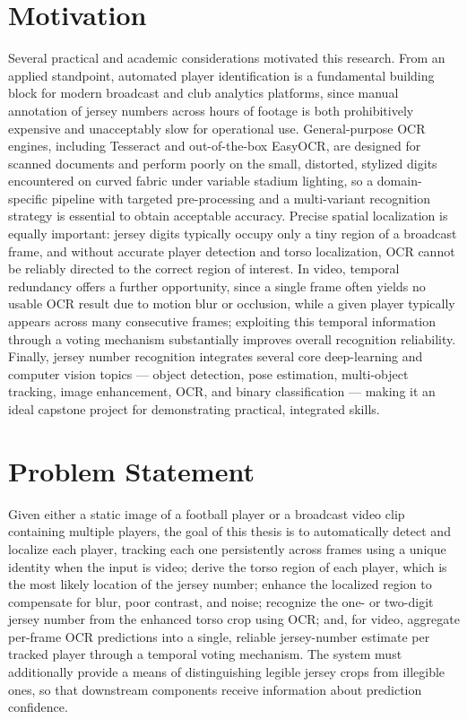 \section{Motivation}
\label{sec:motivation}

Several practical and academic considerations motivated this research.
From an applied standpoint, automated player identification is a
fundamental building block for modern broadcast and club analytics
platforms, since manual annotation of jersey numbers across hours of
footage is both prohibitively expensive and unacceptably slow for
operational use. General-purpose OCR engines, including Tesseract and
out-of-the-box EasyOCR, are designed for scanned documents and perform
poorly on the small, distorted, stylized digits encountered on curved
fabric under variable stadium lighting, so a domain-specific pipeline
with targeted pre-processing and a multi-variant recognition strategy
is essential to obtain acceptable accuracy. Precise spatial
localization is equally important: jersey digits typically occupy only
a tiny region of a broadcast frame, and without accurate player
detection and torso localization, OCR cannot be reliably directed to
the correct region of interest. In video, temporal redundancy offers a
further opportunity, since a single frame often yields no usable OCR
result due to motion blur or occlusion, while a given player typically
appears across many consecutive frames; exploiting this temporal
information through a voting mechanism substantially improves overall
recognition reliability. Finally, jersey number recognition integrates
several core deep-learning and computer vision topics --- object
detection, pose estimation, multi-object tracking, image enhancement,
OCR, and binary classification --- making it an ideal capstone project
for demonstrating practical, integrated skills.

\section{Problem Statement}
\label{sec:problem-statement}

Given either a static image of a football player or a broadcast video
clip containing multiple players, the goal of this thesis is to
automatically detect and localize each player, tracking each one
persistently across frames using a unique identity when the input is
video; derive the torso region of each player, which is the most
likely location of the jersey number; enhance the localized region to
compensate for blur, poor contrast, and noise; recognize the one- or
two-digit jersey number from the enhanced torso crop using OCR; and,
for video, aggregate per-frame OCR predictions into a single, reliable
jersey-number estimate per tracked player through a temporal voting
mechanism. The system must additionally provide a means of
distinguishing legible jersey crops from illegible ones, so that
downstream components receive information about prediction confidence.

